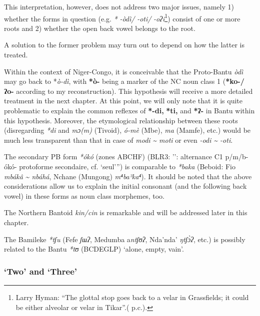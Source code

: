 This interpretation, however, does not address two major issues, namely 1) whether the forms in question (e.g. \textit{*} \textit{-òdì/} \textit{-oti/} \textit{-oʔi}\footnote{Larry Hyman: “The glottal stop goes back to a velar in Grassfields; it could be either alveolar or velar in Tikar”.( p.c.).}) consist of one or more roots and 2) whether the open back vowel belongs to the root. 

A solution to the former problem may turn out to depend on how the latter is treated.

Within the context of Niger-Congo, it is conceivable that the Proto-Bantu \textit{òdì} may go back to *\textit{ò-dì}, with \textbf{*ò-} being a marker of the NC noun class 1 (\textbf{*ko-/} \textbf{ʔo-} according to my reconstruction). This hypothesis will receive a more detailed treatment in the next chapter. At this point, we will only note that it is quite problematic to explain the common reflexes of \textbf{*-di,} \textbf{*ti,} and \textbf{*ʔ-} in Bantu within this hypothesis. Moreover, the etymological relationship between these roots (disregarding \textit{*di} and \textit{mɔ(m)} (Tivoid), \textit{ó-mè} (Mbe), \textit{ma} (Mamfe), etc.) would be much less transparent than that in case of \textit{modi} \textit{{\textasciitilde} moti} or even \textit{-odi {\textasciitilde} -oti}.

The secondary PB form \textit{*ókó} (zones ABCHF) (BLR3: ’’\citealt{Janssens1994}: alternance C1 p/m/b-ókó- protoforme secondaire, cf. `seul'”) is comparable to \textit{*baka} (Beboid: Fio \textit{mbák{\^{a}}} \textit{{\textasciitilde} nbáhá}, Nchane (Mungong) \textit{m⁴ba³ka⁴}). It should be noted that the above considerations allow us to explain the initial consonant (and the following back vowel) in these forms as noun class morphemes, too. 

The Northern Bantoid \textit{kin/cin} is remarkable and will be addressed later in this chapter. 

The Bamileke \textit{*tʃu} (Fefe \textit{ʃɯ}\textit{ʔ}, Medumba a\textit{ntʃʊ}\textit{ʔ}, Nda'nda' \textit{ŋtʃ{\`{ɔ}}ʔ}, etc.) is possibly related to the Bantu \textit{*tʊ} (BCDEGLP) ‘alone, empty, vain’. 

\clearpage
\subsubsection{‘Two’ and ‘Three’} %

